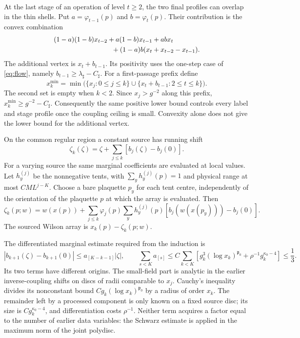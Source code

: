 \documentclass[11pt,letterpaper,reqno]{amsart}
\theoremstyle{definition}
\theoremstyle{remark}
\begin{document}
At the last stage of an operation of level $t\ge2$, the
two final profiles can overlap in the thin shells. Put
$a=\varphi_{t-1}(p)$ and $b=\varphi_t(p)$. Their contribution
is the convex combination
\begin{align*}
 &(1-a)(1-b)x_{t-2}+a(1-b)x_{t-1}+abx_t\\
 &\hspace{30mm}+(1-a)b(x_t+x_{t-2}-x_{t-1}).
\end{align*}
The additional vertex is $x_t+b_{t-1}$. Its positivity
uses the one-step case of \eqref{eq:flow}, namely
$b_{t-1}\ge\lambda_\sharp-C_\sharp$.
For a first-passage prefix define
\begin{equation}\label{eq:revised-profile-minimum}
 x_k^{\min}=\min\bigl(\{x_j:0\le j\le k\}
                \cup\{x_t+b_{t-1}:2\le t\le k\}
                                                \bigr).
\end{equation}
The second set is empty when $k<2$. Since $x_j>g^{-2}$
along this prefix, $x_k^{\min}\ge g^{-2}-C_\sharp$.
Consequently the same positive lower bound controls every
label and stage profile once the coupling ceiling is small.
Convexity alone does not give the lower bound for the
additional vertex.

On the common regular region a constant source has running shift
\[
 \zeta_k(\zeta)=\zeta+\sum_{j\le k}[b_j(\zeta)-b_j(0)].
\]
For a varying source the same marginal coefficients are evaluated at
local values. Let $h_y^{(j)}$ be the nonnegative tents, with
$\sum_yh_y^{(j)}(p)=1$ and physical range at most $CML^{j-K}$.
Choose a bare plaquette $p_y$ for each tent centre, independently of the
orientation of the plaquette $p$ at which the array is evaluated. Then
\[
 \zeta_k(p;w)=w(x(p))+\sum_{j\le k}\varphi_j(p)
       \sum_yh_y^{(j)}(p)[b_j(w(x(p_y)))-b_j(0)].
\]
The sourced Wilson array is $x_k(p)-\zeta_k(p;w)$.

The differentiated marginal estimate required from the induction is
\begin{equation}\label{eq:source-flow}
 |b_{k+1}(\zeta)-b_{k+1}(0)|\le a_{[K-k-1]}|\zeta|,
 \qquad
 \sum_{s<K}a_{[s]}
 \le C\sum_{k<K}\left[g_k^3(\log x_k)^{\mathfrak p_0}
                  +\rho^{-1}g_k^{\kappa_0-4}\right]\le\frac13.
\end{equation}
Its two terms have different origins. The small-field part is analytic
in the earlier inverse-coupling shifts on discs of radii comparable to
$x_j$. Cauchy's inequality divides its nonconstant bound
$Cg_k(\log x_k)^{\mathfrak p_0}$ by a radius of order $x_k$.
The remainder left by a processed component is only known on a fixed
source disc; its size is $Cg_k^{\kappa_0-4}$, and differentiation costs
$\rho^{-1}$. Neither term acquires a factor equal to the number of
earlier data variables: the Schwarz estimate is applied in the maximum
norm of the joint polydisc.
\end{document}
